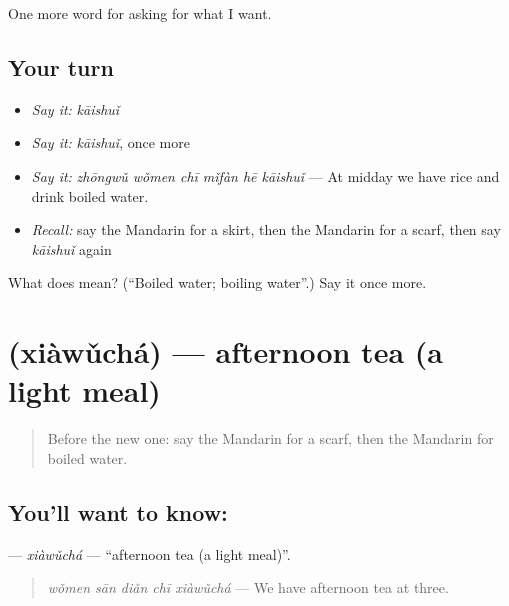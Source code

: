 \begin{grammarlens}[title={What you've built}]
One more word for asking for what I want.
\end{grammarlens}

\subsection*{Your turn}
\begin{itemize}
\raggedright
  \item \emph{Say it:} \emph{kāishuǐ}
  \item \emph{Say it:} \emph{kāishuǐ}, once more
  \item \emph{Say it:} \emph{zhōngwǔ wǒmen chī mǐfàn hē kāishuǐ} — At midday we have rice and drink boiled water.
  \item \emph{Recall:} say the Mandarin for a skirt, then the Mandarin for a scarf, then say \emph{kāishuǐ} again
\end{itemize}

\begin{tcolorbox}[breakable,colback=teal!4,colframe=teal!35!black,title={Before you move on}]
What does  mean? (\textquotedblleft{}Boiled water; boiling water\textquotedblright{}.) Say it once more.
\end{tcolorbox}
\section[\texorpdfstring{\zh{下午茶} (xiàwǔchá)}{下午茶 (xiàwǔchá)}]{ (xiàwǔchá) — afternoon tea (a light meal)}

\label{lesson:ZH-C166-xiawucha}



\begin{quote}
Before the new one: say the Mandarin for a scarf, then the Mandarin for boiled water.
\end{quote}

\subsection*{You'll want to know: }
\textbf{} — \emph{xiàwǔchá} — \textquotedblleft{}afternoon tea (a light meal)\textquotedblright{}.

\begin{quote}
\textbf{} \emph{wǒmen sān diǎn chī xiàwǔchá} — We have afternoon tea at three.
\end{quote}

